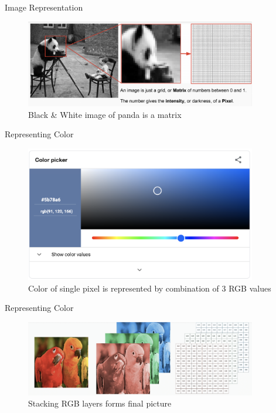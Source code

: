 \begin{frame}{Image Representation}
\begin{figure}
    \centering
    \includegraphics[width=0.9\textwidth]{img/greyscaleimage.png}
    \caption{Black \& White image of panda is a matrix}
\end{figure}
\end{frame}

\begin{frame}{Representing Color}
\begin{figure}
    \centering
    \includegraphics[width=0.9\textwidth]{img/colorpicker.png}
    \caption{Color of single pixel is represented by combination of 3 RGB values}
\end{figure}
\end{frame}

\begin{frame}{Representing Color}
\begin{figure}
    \centering
    \includegraphics[width=0.9\textwidth]{img/rgbparrot.png}
    \caption{Stacking RGB layers forms final picture}
\end{figure}
\end{frame}

